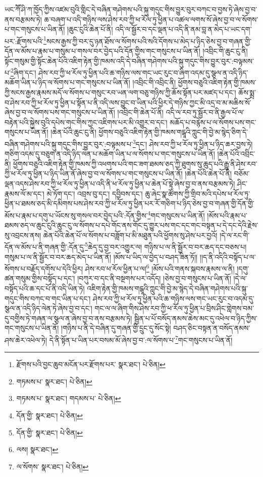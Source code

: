ཡང་ཀཽ་ཤི་ཀ་ཁྱོད་ཀྱིས་འཛམ་བུའི་གླིང་དེ་བཞིན་གཤེགས་པའི་སྐུ་གདུང་གིས་བྱུར་བུར་བཀང་བ་བྱས་ཏེ་ཞེས་བྱ་བ་ནས་བརྩམས་ཏེ། ཆ་བཞག་པ་འདི་གཉིས་ལས་ཤེས་རབ་ཀྱི་ཕ་རོལ་ཏུ་ཕྱིན་པ་འཚལ་ལགས་སོ་ཞེས་བྱ་བ་ལ་སོགས་པ་གང་གསུངས་པ་ཡིན་ནོ། །ཆུང་ངུའི་ཆེན་པོ་ནི། འདི་ལ་སྦྱོར་བ་དང་ལྡན་པ་འདི་ནི་ནམ་བླ་ན་མེད་པ་ཡང་དག་པར་:རྫོགས་པའི་\footnote{རྫོགས་པའི་བྱང་ཆུབ་མངོན་པར་རྫོགས་པར་  སྣར་ཐང་།  པེ་ཅིན། }སངས་རྒྱས་ཀྱི་བར་དུ་ཉན་ཐོས་ལ་སོགས་པའི་སའི་དོགས་པ་མེད་པ་ཉིད་ཅེས་བྱ་བ་གཞན་གྱི་དོན་ལ་མོས་པ་རྣམ་པ་གསུམ་པ་གསལ་བར་བྱེད་པའི་དོན་གྱིས་གང་གསུངས་པ་ཡིན་ནོ། །འབྲིང་གི་ཆུང་ངུ་ནི། སྟོང་གསུམ་གྱི་སྟོང་ཆེན་པོའི་འཇིག་རྟེན་གྱི་ཁམས་འདི་དེ་བཞིན་གཤེགས་པའི་སྐུ་གདུང་གིས་བྱུར་བུར་:བལྟམས་པ་\footnote{གཏམས་པ་  སྣར་ཐང་།  པེ་ཅིན། }ཞིག་དང་། ཤེས་རབ་ཀྱི་ཕ་རོལ་ཏུ་ཕྱིན་པའི་ཆ་གཉིས་ལས་གང་ཡང་རུང་བ་ཞིག་འདམ་དུ་སྩལ་ན་འདི་ཉིད་མཆོག་ཡིན་པ་ཉིད་ལ་སོགས་པ་གང་གསུངས་པ་ཡིན་ནོ། །འབྲིང་གི་འབྲིང་ནི། ཕྱོགས་བཅུའི་འཇིག་རྟེན་གྱི་ཁམས་ཀྱི་སངས་རྒྱས་རྣམས་མདོ་ལ་སོགས་པ་གསུང་རབ་ཡན་ལག་བཅུ་གཉིས་ཀྱི་ཆོས་སྟོན་པར་མཛད་པ་དང་། ཆོས་སྨྲ་བ་ཤེས་རབ་ཀྱི་ཕ་རོལ་ཏུ་ཕྱིན་པ་སྟོན་པ་ནི་འདི་ལས་བྱུང་བ་ཡིན་པའི་ཕྱིར་དེ་གཉིས་ཀྱང་མི་འདྲ་བ་མ་མཆིས་སོ་ཞེས་བྱ་བ་ལ་སོགས་པས་གང་གསུངས་པ་ཡིན་ནོ། །འབྲིང་གི་ཆེན་པོ་ནི། འདི་ལ་རབ་ཏུ་སྦྱོར་བ་ནི་རྒྱལ་པོ་ལ་བརྟེན་པའི་སྐྱེས་བུའི་དཔེས་གང་གིས་ཀྱང་འཇིགས་པར་མི་འགྱུར་བ་དང་། མཆོད་པ་བརྙེས་པ་ལ་སོགས་པས་གང་གསུངས་པ་ཡིན་ནོ། །ཆེན་པོའི་ཆུང་ངུ་ནི། ཕྱོགས་བཅུའི་འཇིག་རྟེན་གྱི་ཁམས་གངྒཱའི་ཀླུང་གི་བྱེ་མ་སྙེད་ཅིག་དེ་བཞིན་གཤེགས་པའི་སྐུ་གདུང་གིས་བྱུར་བུར་:བལྟམས་པ་\footnote{གཏམས་པ་  སྣར་ཐང་། གདམས་པ་  པེ་ཅིན། }དང་། ཤེས་རབ་ཀྱི་ཕ་རོལ་ཏུ་ཕྱིན་པ་ཉིད་ཆར་བྱས་ཏེ། གཅིག་འདམ་དུ་བཅུག་ན་འདི་ཉིད་ལེན་པ་མཆོག་ཡིན་པ་ལ་སོགས་པ་གང་གསུངས་པ་ཡིན་ནོ། །ཆེན་པོའི་འབྲིང་ནི། ཕྱོགས་བཅུའི་འཇིག་རྟེན་གྱི་ཁམས་ཀྱི་འཕགས་པའི་གང་ཟག་ཐམས་ཅད་ཀྱི་ཐུགས་སུ་ཆུད་པའི་རྒྱུ་ནི་ཤེས་རབ་ཀྱི་ཕ་རོལ་ཏུ་ཕྱིན་པ་ཉིད་ཡིན་ནོ་ཞེས་བྱ་བ་ལ་སོགས་པ་གང་གསུངས་པ་ཡིན་ནོ། །ཆེན་པོའི་ཆེན་པོ་ནི། བཅོམ་ལྡན་འདས་ཤེས་རབ་ཀྱི་ཕ་རོལ་ཏུ་ཕྱིན་པ་འདི་ནི་ཕ་རོལ་ཏུ་ཕྱིན་པ་ཆེན་པོ་སྟེ་ཞེས་བྱ་བ་ནས་བརྩམས་ཏེ། ཤིང་རྣམས་ལོ་མ་དང་། མེ་ཏོག་དང་། འབྲས་བུ་དང་། དབྱིབས་དང་། ཆུ་ཞེང་སྣ་ཚོགས་ཀྱི་གྲིབ་མའི་དཔེས་ཕ་རོལ་ཏུ་ཕྱིན་པ་ཐམས་ཅད་མི་དམིགས་པས་ཤེས་རབ་ཀྱི་ཕ་རོལ་ཏུ་ཕྱིན་པར་རོ་གཅིག་པ་ཉིད་ཅེས་བྱ་བ་གཞན་གྱི་དོན་གྱི་མོས་པ་རྣམ་པ་དགུ་པ་ཡོངས་སུ་གསལ་བར་བྱེད་པའི་:དོན་གྱིས་\footnote{དོན་གྱི་  སྣར་ཐང་།  པེ་ཅིན། }གང་གསུངས་པ་ཡིན་ནོ། །མོས་པའི་རྣམ་པ་ཐམས་ཅད་ལ་ཆུང་ངུའི་ཆུང་ངུ་ལ་སོགས་པ་དཔེ་གོང་ནས་གོང་དུ་གྱུར་པས་གང་དང་གང་བསྟན་པ་དེ་དང་དེའི་རྗེས་སུ་འབྲངས་ནས། ཆེན་པོའི་ཆེན་པོ་ལ་སོགས་པ་བཟློག་པ་མི་མཐུན་པའི་ཕྱོགས་སུ་ཤེས་པར་བྱའོ། །དེ་ལ་རང་གི་དོན་ལ་མོས་པ་ནི་གཞན་གྱི་:དོན་དུ་\footnote{དོན་གྱི་  སྣར་ཐང་།  པེ་ཅིན། }ཆེད་དུ་བྱ་བར་འགྱུར་ལ། གཉིས་པ་ལ་ནི་སྦྱོར་བ་བར་ཆད་དང་བཅས་པ། གསུམ་པ་ལ་ནི་སྦྱོར་བ་བར་ཆད་མེད་པ་ཡིན་ནོ། །མོས་པ་ཡིད་ལ་བྱེད་པ་བཤད་ཟིན་ཏོ།། །།ད་ནི་འདིའི་བསྟོད་པ་ལ་སོགས་པ་བརྗོད་དགོས་པ་དེའི་ཕྱིར། ཤེས་རབ་ཕ་རོལ་ཕྱིན་པ་ལ།\footnote{ལས།  སྣར་ཐང་། } །མོས་པའི་གནས་སྐབས་རྣམས་ལ་ནི། །དགུ་ཚན་གསུམ་གྱིས་བསྟོད་པ་དང་། །བཀུར་བ་དང་ནི་བསྔགས་པར་འདོད། །ཅེས་བྱ་བ་གསུངས་པ་ཡིན་ནོ། །དེ་ལ་བསྟོད་པའི་ཆ་དང་པོ་ནི་འདི་ཡིན་ཏེ། འཇིག་རྟེན་གྱི་ཁམས་གངྒཱའི་ཀླུང་གི་བྱེ་མ་སྙེད་དེ་བཞིན་གཤེགས་པའི་སྐུ་གདུང་གིས་བཀང་བ་གང་ཡིན་པ་དང་། ཤེས་རབ་ཀྱི་ཕ་རོལ་ཏུ་ཕྱིན་པའི་ཆ་གཉིས་ལས་གང་ཡང་རུང་བ་འདམ་དུ་སྩལ་ན་འདི་ཉིད་ལེན་ཏེ་ཞེས་བྱ་བ་དང་། གང་ལ་ལ་ཞིག་གིས་ཤེས་རབ་ཀྱི་ཕ་རོལ་ཏུ་ཕྱིན་པ་བྲིས་ཤིང་གླེགས་བམ་དུ་བགྱིས་ཏེ་གཞན་ལ་སྩལ་ན་ཞེས་བྱ་བ་ནས་བརྩམས་ཏེ། སྦྱིན་པ་པོ་བསོད་ནམས་ཆེས་མང་དུ་འཕེལ་བ་ཉིད་ཀྱིས་གང་གསུངས་པ་ཡིན་ནོ། །གཉིས་པ་ནི་དེ་བཞིན་དུ་གཞན་གྱི་དྲུང་དུ་སོང་སྟེ། བཤད་ཅིང་བསྟན་ན་བསོད་ནམས་ཤས་ཆེར་འཕེལ་ཏེ། དེ་ནི་སྟོན་པ་ཡིན་པར་བསམ་མོ་ཞེས་བྱ་བ་:ལ་སོགས་པ་\footnote{ལ་སོགས་  སྣར་ཐང་།  པེ་ཅིན། }གང་གསུངས་པ་ཡིན་ནོ། 